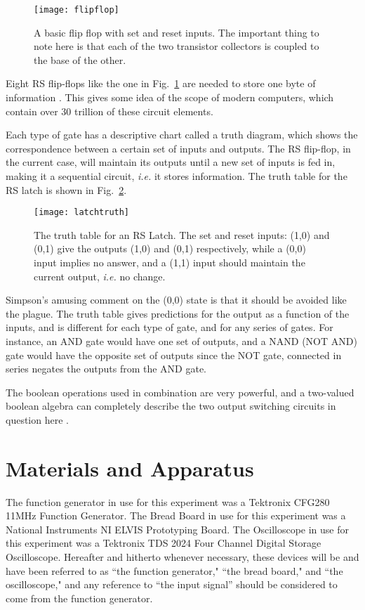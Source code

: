 \documentclass[aps,pre,twocolumn,nofootinbib]{revtex4}
\begin{document}
\begin{figure}[h]
\centering
\texttt{[image: flipflop]} 
\caption{A basic flip flop with set and reset inputs.  The important thing to note here is that each of the two transistor collectors is coupled to the base of the other.}
\label{flipflop}
\end{figure}

Eight RS flip-flops like the one in Fig.~\ref{flipflop} are needed to store one byte of information \cite{simpson}.  This gives some idea of the scope of modern computers, which contain over 30 trillion of these circuit elements.

Each type of gate has a descriptive chart called a truth diagram, which shows the correspondence between  a certain set of inputs and outputs.  The RS flip-flop, in the current case, will maintain its outputs until a new set of inputs is fed in, making it a sequential circuit, \textit{i.e.} it stores information.  The truth table for the RS latch is shown in Fig.~\ref{latchtruth}.  

\begin{figure}[h]
\centering
\texttt{[image: latchtruth]} 
\caption{The truth table for an RS Latch.  The set and reset inputs: (1,0) and (0,1) give the outputs (1,0) and (0,1) respectively, while a (0,0) input implies no answer, and a (1,1) input should maintain the current output, \textit{i.e.} no change.}
\label{latchtruth}
\end{figure}

Simpson's amusing comment on the (0,0) state is that it should be avoided like the plague.  The truth table gives predictions for the output as a function of the inputs, and is different for each type of gate, and for any series of gates.  For instance, an AND gate would have one set of outputs, and a NAND (NOT AND) gate would have the opposite set of outputs since the NOT gate, connected in series negates the outputs from the AND gate.  

The boolean operations used in combination are very powerful, and a two-valued boolean algebra can completely describe the two output switching circuits in question here \cite{simpson}.

\section{Materials and Apparatus}
The function generator in use for this experiment was a Tektronix CFG280 11MHz Function Generator.  The Bread Board in use for this experiment was a National Instruments NI ELVIS Prototyping Board.  The Oscilloscope in use for this experiment was a Tektronix TDS 2024 Four Channel Digital Storage Oscilloscope.   Hereafter and hitherto whenever necessary, these devices will be and have been referred to as ``the function generator," ``the bread board," and ``the oscilloscope," and any reference to ``the input signal'' should be considered to come from the function generator.  
\end{document}
